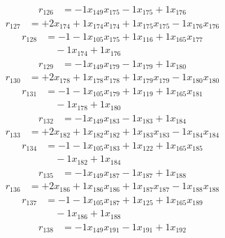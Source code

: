 \[\begin{aligned}
r_{126} &= - 1 x_{149} x_{175} - 1 x_{175} + 1 x_{176}
\end{aligned}\]
\[\begin{aligned}
r_{127} &= + 2 x_{174} + 1 x_{174} x_{174} + 1 x_{175} x_{175} - 1 x_{176} x_{176}
\end{aligned}\]
\[\begin{aligned}
r_{128} &= - 1 - 1 x_{105} x_{175} + 1 x_{116} + 1 x_{165} x_{177} \\
 &\quad - 1 x_{174} + 1 x_{176}
\end{aligned}\]
\[\begin{aligned}
r_{129} &= - 1 x_{149} x_{179} - 1 x_{179} + 1 x_{180}
\end{aligned}\]
\[\begin{aligned}
r_{130} &= + 2 x_{178} + 1 x_{178} x_{178} + 1 x_{179} x_{179} - 1 x_{180} x_{180}
\end{aligned}\]
\[\begin{aligned}
r_{131} &= - 1 - 1 x_{105} x_{179} + 1 x_{119} + 1 x_{165} x_{181} \\
 &\quad - 1 x_{178} + 1 x_{180}
\end{aligned}\]
\[\begin{aligned}
r_{132} &= - 1 x_{149} x_{183} - 1 x_{183} + 1 x_{184}
\end{aligned}\]
\[\begin{aligned}
r_{133} &= + 2 x_{182} + 1 x_{182} x_{182} + 1 x_{183} x_{183} - 1 x_{184} x_{184}
\end{aligned}\]
\[\begin{aligned}
r_{134} &= - 1 - 1 x_{105} x_{183} + 1 x_{122} + 1 x_{165} x_{185} \\
 &\quad - 1 x_{182} + 1 x_{184}
\end{aligned}\]
\[\begin{aligned}
r_{135} &= - 1 x_{149} x_{187} - 1 x_{187} + 1 x_{188}
\end{aligned}\]
\[\begin{aligned}
r_{136} &= + 2 x_{186} + 1 x_{186} x_{186} + 1 x_{187} x_{187} - 1 x_{188} x_{188}
\end{aligned}\]
\[\begin{aligned}
r_{137} &= - 1 - 1 x_{105} x_{187} + 1 x_{125} + 1 x_{165} x_{189} \\
 &\quad - 1 x_{186} + 1 x_{188}
\end{aligned}\]
\[\begin{aligned}
r_{138} &= - 1 x_{149} x_{191} - 1 x_{191} + 1 x_{192}
\end{aligned}\]

